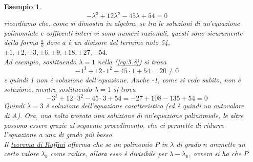 \documentclass{book}
\newtheorem{esempio}{Esempio}[section]
\begin{document}
\begin{esempio}
\begin{equation}
    -\lambda^3+12\lambda^2-45\lambda+54=0
  \end{equation}
  ricordiamo che, come si dimostra in algebra, se tra le soluzioni di un'equazione polinomiale e cofficenti interi
  vi sono numeri razionali, questi sono sicuramente della forma $\frac{a}{b}$ dove $a$ è un divisore del termine
  noto 54, $\pm1,\pm2,\pm3,\pm6,\pm9,\pm18,\pm27,\pm54$.\\
  Ad esempio, sostituendo $\lambda=1$ nella (\ref{eq:5.8}) si trova
  \begin{equation*}
    -1^3+12\cdot 1^2-45\cdot1 +54=20\neq 0
  \end{equation*}
  e quindi 1 non è soluzione dell'equazione. Anche -1, come si vede subito, non è soluzione, mentre sostituendo
  $\lambda=1$ si trova
  \begin{equation*}
    -3^3+12\cdot 3^2-45\cdot 3 +54=-27+108-135+54=0
  \end{equation*}
  Quindi $\lambda=3$ è soluzione dell'equazione caratteristica (ed è quindi un autovalore di $A$). Ora, una volta
  trovata una soluzione di un'equazione polinomiale, le altre possono essere grazie al seguente procedimento, che
  ci permette di ridurre l'equazione a una di grado più basso.\\
  Il \underline{teorema di Ruffini} afferma che se un polinomio $P$ in $\lambda$ di grado $n$ ammette un certo
  valore $\lambda_0$ come radice, allora esso è divisibile per $\lambda-\lambda_0$, ovvero si ha che $P$ 
\end{esempio}
\end{document}
